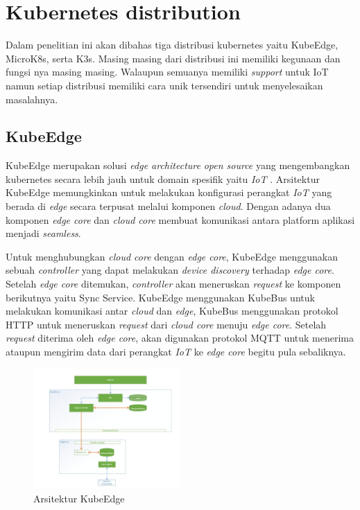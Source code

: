 \section{Kubernetes distribution}
Dalam penelitian ini akan dibahas tiga distribusi kubernetes yaitu KubeEdge, MicroK8s, serta K3s. Masing masing dari distribusi ini memiliki kegunaan dan fungsi nya masing masing. Walaupun semuanya memiliki \textit{support} untuk IoT namun setiap distribusi memiliki cara unik tersendiri untuk menyelesaikan masalahnya.

\subsection{KubeEdge}
KubeEdge merupakan solusi \textit{edge architecture} \textit{open source} yang mengembangkan kubernetes secara lebih jauh untuk domain spesifik yaitu \textit{IoT} \parencite{kubeedge}. Arsitektur KubeEdge memungkinkan untuk melakukan konfigurasi perangkat \textit{IoT} yang berada di \textit{edge} secara terpusat melalui komponen \textit{cloud}. Dengan adanya dua komponen \textit{edge core} dan \textit{cloud core} membuat komunikasi antara platform aplikasi menjadi \textit{seamless}.

Untuk menghubungkan \textit{cloud core} dengan \textit{edge core}, KubeEdge menggunakan sebuah \textit{controller} yang dapat melakukan \textit{device discovery} terhadap \textit{edge core}. Setelah \textit{edge core} ditemukan, \textit{controller} akan meneruskan \textit{request} ke komponen berikutnya yaitu Sync Service. KubeEdge menggunakan KubeBus untuk melakukan komunikasi antar \textit{cloud} dan \textit{edge}, KubeBus menggunakan protokol HTTP untuk meneruskan \textit{request} dari \textit{cloud core} menuju \textit{edge core}. Setelah \textit{request} diterima oleh \textit{edge core}, akan digunakan protokol MQTT untuk menerima ataupun mengirim data dari perangkat \textit{IoT} ke \textit{edge core} begitu pula sebaliknya.

\begin{figure}[ht]
  \centering
  \includegraphics[width=0.5\textwidth]{resources/chapter-2/arsitektur-kube-edge.jpg}
  \caption{Arsitektur KubeEdge \parencite{kubeedge}}
  \label{fig:arsitektur-kube-edge}
\end{figure}

